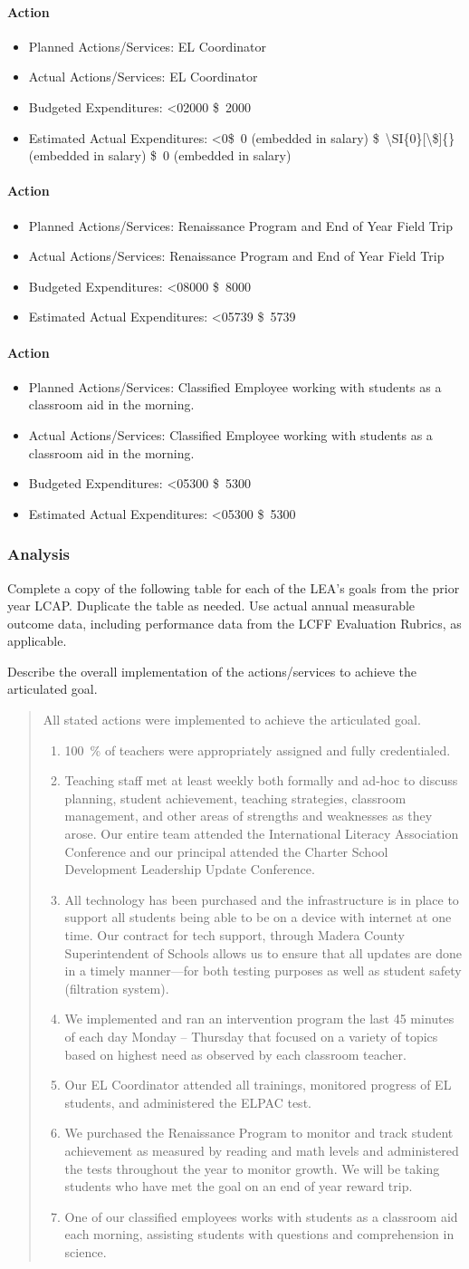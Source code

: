 \documentclass{article}
\newcommand{\dollar}[1]{\SI{#1}[\$]{}}
\newcounter{goal}[section]
\newcounter{action}[goal]
\newcommand{\actionupdate}[4]{
	\stepcounter{action}
	\paragraph{Action \theaction}
	\begin{itemize}[label={}]
		\item Planned Actions/Services: #1
		\item Actual Actions/Services: #2
		\item Budgeted Expenditures: 
			\ifnum0<0#3\relax
				\dollar{#3}
			\else
				#3
			\fi
		\item Estimated Actual Expenditures: 
			\ifnum0<0#4\relax
				\dollar{#4}
			\else
				#4
			\fi
	\end{itemize}
}
\newenvironment{actionanalysis}
	{
		\begin{enumerate}[label={\bf Action \theenumi:}]
	}
	{\end{enumerate}}
\begin{document}
\actionupdate
	{EL Coordinator}
	{EL Coordinator}
	{2000}
	{\dollar{0} (embedded in salary)}

\actionupdate
	{Renaissance Program and End of Year Field Trip}
	{Renaissance Program and End of Year Field Trip}
	{8000}
	{5739}

\actionupdate
	{Classified Employee working with students as a classroom aid in the morning.}
	{Classified Employee working with students as a classroom aid in the morning.}
	{5300}
	{5300}

\subsubsection{Analysis}
Complete a copy of the following table for each of the LEA's goals from the prior year LCAP. Duplicate the table as needed. Use actual annual measurable outcome data, including performance data from the LCFF Evaluation Rubrics, as applicable.

Describe the overall implementation of the actions/services to achieve the articulated goal.
\begin{quote}
	All stated actions were implemented to achieve the articulated goal.
	\begin{actionanalysis}
	\item \SI{100}{\percent} of teachers were appropriately assigned and fully credentialed.
	\item Teaching staff met at least weekly both formally and ad-hoc to discuss planning, student achievement, teaching strategies, classroom management, and other areas of strengths and weaknesses as they arose. Our entire team attended the International Literacy Association Conference and our principal attended the Charter School Development Leadership Update Conference.
	\item All technology has been purchased and the infrastructure is in place to support all students being able to be on a device with internet at one time. Our contract for tech support, through Madera County Superintendent of Schools allows us to ensure that all updates are done in a timely manner---for both testing purposes as well as student safety (filtration system).
	\item We implemented and ran an intervention program the last 45 minutes of each day Monday -- Thursday that focused on a variety of topics based on highest need as observed by each classroom teacher.
	\item Our EL Coordinator attended all trainings, monitored progress of EL students, and administered the ELPAC test.
	\item We purchased the Renaissance Program to monitor and track student achievement as measured by reading and math levels and administered the tests throughout the year to monitor growth. We will be taking students who have met the goal on an end of year reward trip.
	\item One of our classified employees works with students as a classroom aid each morning, assisting students with questions and comprehension in science.
	\end{actionanalysis}
\end{quote}
\end{document}
